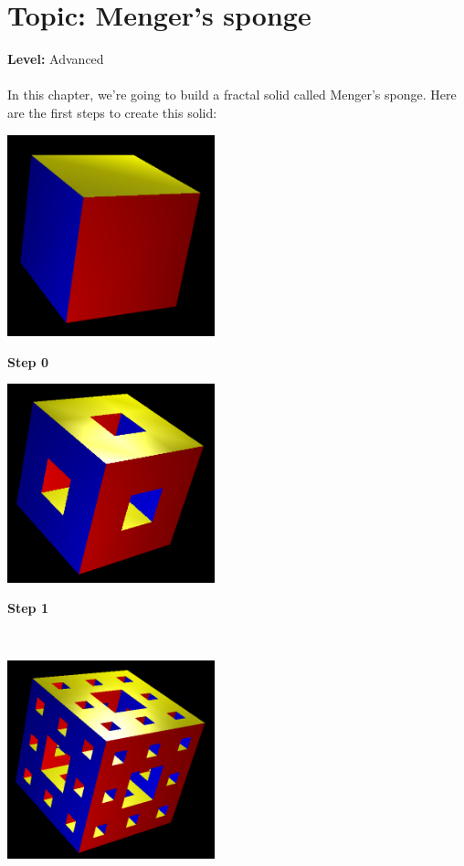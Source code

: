 \chapter{Topic: Menger's sponge}
{ }\hfill\textbf{Level:} Advanced\\ \\
In this chapter, we're going to build a fractal solid called Menger's sponge. Here are the first steps to create this solid:
\begin{center}
\begin{minipage}{6cm}
\includegraphics[width=6cm]{pics/menger0.png}
\begin{center}
 \textbf{Step 0}
\end{center}
\end{minipage}
\begin{minipage}{6cm}
\includegraphics[width=6cm]{pics/menger1.png}
\begin{center}
 \textbf{Step 1}
\end{center}
\end{minipage}
\\
\begin{minipage}{6cm}
\includegraphics[width=6cm]{pics/menger2.png}

\end{minipage}
\end{center}
